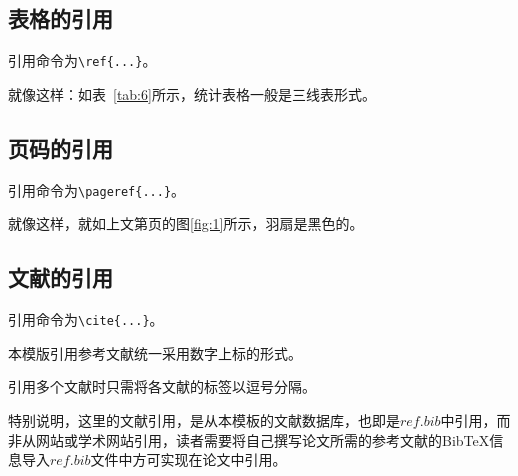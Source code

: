 \subsection{表格的引用}

引用命令为\verb|\ref{...}|。

就像这样：如表~\ref{tab:6}所示，统计表格一般是三线表形式。

\subsection{页码的引用}

引用命令为\verb|\pageref{...}|。

就像这样，就如上文第\pageref{fig:1}页的图\ref{fig:1}所示，羽扇是黑色的。

\subsection{文献的引用}

引用命令为\verb|\cite{...}|。

本模版引用参考文献统一采用数字上标的形式\cite{r1}。

引用多个文献时只需将各文献的标签以逗号分隔\cite{r1,r2,r3,r4,r5}。

特别说明，这里的文献引用，是从本模板的文献数据库，也即是$ref.bib$中引用，而非从网站或学术网站引用，读者需要将自己撰写论文所需的参考文献的BibTeX信息导入$ref.bib$文件中方可实现在论文中引用。